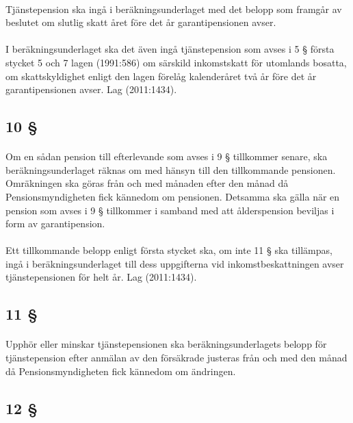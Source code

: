 \documentclass[a4paper,notitlepage,openany,10pt]{book}
\begin{document}
\paragraph*{}
Tjänstepension ska ingå i beräkningsunderlaget med det belopp som framgår av beslutet om slutlig skatt året före det år garantipensionen avser.
\paragraph*{}
I beräkningsunderlaget ska det även ingå tjänstepension som avses i 5 § första stycket 5 och 7 lagen (1991:586) om särskild inkomstskatt för utomlands bosatta, om skattskyldighet enligt den lagen förelåg kalenderåret två år före det år garantipensionen avser.
Lag (2011:1434).
\subsection*{10 §}
\paragraph*{}
Om en sådan pension till efterlevande som avses i 9 § tillkommer senare, ska beräkningsunderlaget räknas om med hänsyn till den tillkommande pensionen. Omräkningen ska göras från och med månaden efter den månad då Pensionsmyndigheten fick kännedom om pensionen. Detsamma ska gälla när en pension som avses i 9 § tillkommer i samband med att ålderspension beviljas i form av garantipension.
\paragraph*{}
Ett tillkommande belopp enligt första stycket ska, om inte 11 § ska tillämpas, ingå i beräkningsunderlaget till dess uppgifterna vid inkomstbeskattningen avser tjänstepensionen för helt år.
Lag (2011:1434).
\subsection*{11 §}
\paragraph*{}
Upphör eller minskar tjänstepensionen ska beräkningsunderlagets belopp för tjänstepension efter anmälan av den försäkrade justeras från och med den månad då Pensionsmyndigheten fick kännedom om ändringen.
\subsection*{12 §}
\end{document}
